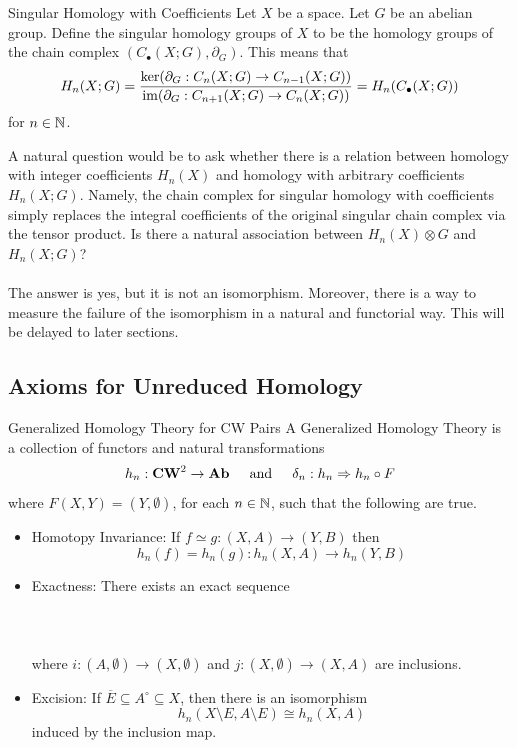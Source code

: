 \documentclass[a4paper]{article}
\begin{document}
\begin{defn}{Singular Homology with Coefficients}{} Let $X$ be a space. Let $G$ be an abelian group. Define the singular homology groups of $X$ to be the homology groups of the chain complex $(C_\bullet(X;G),\partial_G)$. This means that $$H_n(X;G)=\frac{\ker(\partial_G:C_n(X;G)\to C_{n-1}(X;G))}{\operatorname{im}(\partial_G:C_{n+1}(X;G)\to C_n(X;G))}=H_n(C_\bullet(X;G))$$ for $n\in\mathbb{N}$. 
\end{defn}

A natural question would be to ask whether there is a relation between homology with integer coefficients $H_n(X)$ and homology with arbitrary coefficients $H_n(X;G)$. Namely, the chain complex for singular homology with coefficients simply replaces the integral coefficients of the original singular chain complex via the tensor product. Is there a natural association between $H_n(X)\otimes G$ and $H_n(X;G)$? \\~\\

The answer is yes, but it is not an isomorphism. Moreover, there is a way to measure the failure of the isomorphism in a natural and functorial way. This will be delayed to later sections. 

\subsection{Axioms for Unreduced Homology}
\begin{defn}{Generalized Homology Theory for CW Pairs}{} A Generalized Homology Theory is a collection of functors and natural transformations $$h_n:\bold{CW}^2\to\bold{Ab}\;\;\;\;\text{ and }\;\;\;\;\delta_n:h_n\Rightarrow h_n\circ F$$ where $F(X,Y)=(Y,\emptyset)$, for each $n\in\mathbb{N}$, such that the following are true. 
\begin{itemize}
\item Homotopy Invariance: If $f\simeq g:(X,A)\to(Y,B)$ then $$h_n(f)=h_n(g):h_n(X,A)\to h_n(Y,B)$$
\item Exactness: There exists an exact sequence \\~\\
\\~\\
where $i:(A,\emptyset)\to(X,\emptyset)$ and $j:(X,\emptyset)\to(X,A)$ are inclusions. 
\item Excision: If $\overline{E}\subseteq A^\circ\subseteq X$, then there is an isomorphism $$h_n(X\setminus E,A\setminus E)\cong h_n(X,A)$$ induced by the inclusion map. 
\end{itemize}
\end{defn}
\end{document}
